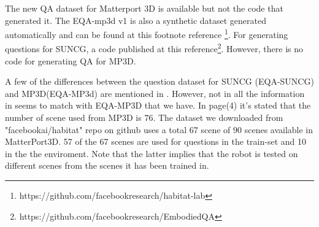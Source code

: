 \documentclass[11pt, a4paper]{article}
\begin{document}
The new QA dataset for Matterport 3D is available but not the code that generated it. The EQA-mp3d v1 is also a synthetic dataset generated automatically and can be found at this footnote reference \footnote{https://github.com/facebookresearch/habitat-lab}. For generating  questions for SUNCG, a code published at this reference\footnote{https://github.com/facebookresearch/EmbodiedQA}. However, there is no code for generating QA for MP3D. 
 
A few of the differences between the question dataset for SUNCG (EQA-SUNCG) and MP3D(EQA-MP3d) are mentioned in \cite{eqa_matterport}. However, not in all the information in  \cite{eqa_matterport} seems to match with EQA-MP3D that we have. In  \cite{eqa_matterport} page(4) it's stated that the number of scene used from MP3D is 76. The dataset we downloaded from "facebookai/habitat" repo on github uses a total 67 scene of 90 scenes available in MatterPort3D. 57 of the 67 scenes are used for questions in the train-set and 10 in the the enviroment. Note that the latter implies that the robot is tested on different scenes from the scenes it has been trained in. 
\end{document}
